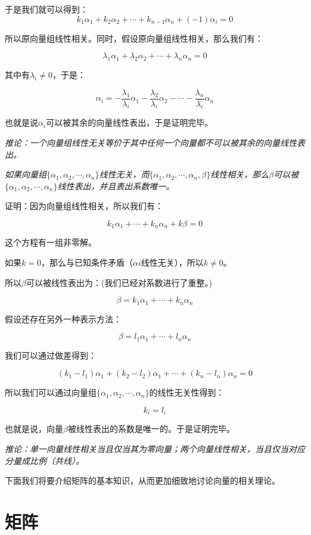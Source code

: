 \documentclass[a4paper]{ctexart}
\begin{document}
于是我们就可以得到：
$$
k_{1}\alpha_{1}+k_{2}\alpha_{2}+\cdots+k_{n-1}\alpha_{n}+(-1)\alpha_{i}=0
$$

所以原向量组线性相关。同时，假设原向量组线性相关，那么我们有：

$$
\lambda_1\alpha_1+\lambda_2\alpha_2+\cdots+\lambda_n\alpha_n=0
$$

其中有$\lambda_{i}\neq 0$，于是：

$$
\alpha_{i}=-\frac{\lambda_{1}}{\lambda_{i}}\alpha_{1}-\frac{\lambda_{2}}{\lambda_{i}}\alpha_{2}-\cdots-\frac{\lambda_{n}}{\lambda_{i}}\alpha_{n}
$$

也就是说$\alpha_{i}$可以被其余的向量线性表出，于是证明完毕。

\textit{推论：一个向量组线性无关等价于其中任何一个向量都不可以被其余的向量线性表出。}

\textit{如果向量组$\{\alpha_1,\alpha_2,\cdots,\alpha_n\}$线性无关，而$\{\alpha_1,\alpha_2,\cdots,\alpha_n,\beta\}$线性相关，那么$\beta$可以被$\{\alpha_1,\alpha_2,\cdots,\alpha_n\}$线性表出，并且表出系数唯一。}

证明：因为向量组线性相关，所以我们有：

$$
k_{1}\alpha_{1}+\cdots+k_{n}\alpha_{n}+k\beta=0
$$

这个方程有一组非零解。

如果$k=0$，那么与已知条件矛盾（$\alpha{i}$线性无关），所以$k\neq 0 $。

所以$\beta$可以被线性表出为：(我们已经对系数进行了重整。)

$$
\beta=k_{1}\alpha_{1}+\cdots+k_{n}\alpha_{n}
$$

假设还存在另外一种表示方法：

$$
\beta=l_{1}\alpha_{1}+\cdots+l_{n}\alpha_{n}
$$

我们可以通过做差得到：

$$
(k_{1}-l_{1})\alpha_{1}+(k_{2}-l_{2})\alpha_{1}+\cdots+(k_{n}-l_{n})\alpha_{n}=0
$$

所以我们可以通过向量组$\{\alpha_1,\alpha_2,\cdots,\alpha_n\}$的线性无关性得到：

$$
k_{i}=l_{i}
$$

也就是说，向量$\beta$被线性表出的系数是唯一的。于是证明完毕。

\textit{推论：单一向量线性相关当且仅当其为零向量；两个向量线性相关，当且仅当对应分量成比例（共线）。}

下面我们将要介绍矩阵的基本知识，从而更加细致地讨论向量的相关理论。

\section{矩阵}
\end{document}
